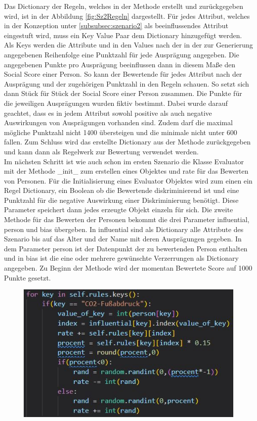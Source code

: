 \begin{onehalfspace}
Das Dictionary der Regeln, welches in der Methode erstellt und zurückgegeben wird, ist in der Abbildung \ref{fig:Sz2Regeln} dargestellt. Für jedes Attribut, welches in der Konzeption unter \ref{subsubsec:szenario2} als beeinflussendes Attribut eingestuft wird, muss ein Key Value Paar dem Dictionary hinzugefügt werden. Als Keys werden die Attribute und in den Values nach der in der zur Generierung angegebenen Reihenfolge eine Punktzahl für jede Ausprägung angegeben. Die angegebenen Punkte pro Ausprägung beeinflussen dann in diesem Maße den Social Score einer Person. So kann der Bewertende für jedes Attribut nach der Ausprägung und der zugehörigen Punktzahl in den Regeln schauen. So setzt sich dann Stück für Stück der Social Score einer Person zusammen. Die Punkte für die jeweiligen Ausprägungen wurden fiktiv bestimmt. Dabei wurde darauf geachtet, dass es in jedem Attribut sowohl positive als auch negative Auswirkungen von Ausprägungen vorhanden sind. Zudem darf die maximal mögliche Punktzahl nicht 1400 übersteigen und die minimale nicht unter 600 fallen. Zum Schluss wird das erstellte Dictionary aus der Methode zurückgegeben und kann dann als Regelwerk zur Bewertung verwendet werden.\\
Im nächsten Schritt ist wie auch schon im ersten Szenario die Klasse \glqq{}Evaluator\grqq{} mit der Methode \glqq{}\_init\_\grqq{} zum erstellen eines Objektes und \glqq{}rate\grqq{} für das Bewerten von Personen. Für die Initialisierung eines \glqq{}Evaluator\grqq{} Objektes wird zum einen ein Regel Dictionary, ein Boolean ob die Bewertende diskriminierend ist und eine Punktzahl für die negative Auswirkung einer Diskriminierung benötigt. Diese Parameter speichert dann jedes erzeugte Objekt einzeln für sich. Die zweite Methode für das Bewerten der Personen bekommt die drei Parameter \glqq{}influential\grqq{}, \glqq{}person\grqq{} und \glqq{}bias\grqq{} übergeben. In \glqq{}influential\grqq{} sind als Dictionary alle Attribute des Szenario bis auf das Alter und der Name mit deren Ausprägungen gegeben. In dem Parameter \glqq{}person\grqq{} ist der Datenpunkt der zu bewertenden Person enthalten und in \glqq{}bias\grqq{} ist die eine oder mehrere gewünschte Verzerrungen als Dictionary angegeben. Zu Beginn der Methode wird der momentan Bewertete Score auf 1000 Punkte gesetzt. 
\begin{figure}[h]
    \centering
    \includegraphics[width=16cm]{Diagramme/Sz2Rate1.JPG}

\end{figure}
\end{onehalfspace}
